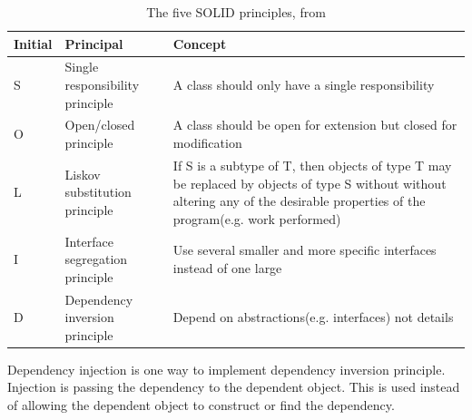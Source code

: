 \documentclass[10pt,a4paper]{report}
\begin{document}
\begin{table}[h]
\begin{tabular}{ l l p{2in}}
  \hline
  Initial & Principal & Concept\\
  \hline
  S & Single responsibility principle & A class should only have a single responsibility \\
  O & Open/closed principle & A class should be open for extension but closed for modification \\
  L & Liskov substitution principle & If S is a subtype of T, then objects of type T may be replaced by objects of type S without without altering any of the desirable properties of the program(e.g. work performed)\\
  I & Interface segregation principle & Use several smaller and more specific interfaces instead of one large \\
  D & Dependency inversion principle & Depend on abstractions(e.g. interfaces) not details \\
  \hline  
\end{tabular}
\caption{The five SOLID principles, from \cite{cleancode2008}}
\label{table:solid_table}
\end{table}

Dependency injection is one way to implement dependency inversion principle\cite{cleancode2008}. Injection is passing the dependency to the dependent object. This is used instead of allowing the dependent object to construct or find the dependency.
\end{document}
